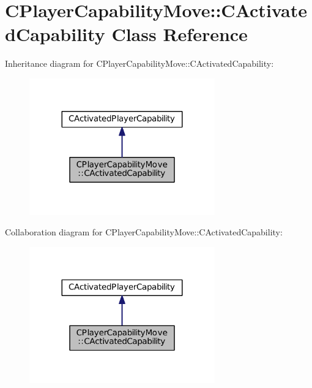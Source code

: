 \hypertarget{classCPlayerCapabilityMove_1_1CActivatedCapability}{}\section{C\+Player\+Capability\+Move\+:\+:C\+Activated\+Capability Class Reference}
\label{classCPlayerCapabilityMove_1_1CActivatedCapability}


Inheritance diagram for C\+Player\+Capability\+Move\+:\+:C\+Activated\+Capability\+:\nopagebreak
\begin{figure}[H]
\begin{center}
\leavevmode
\includegraphics[width=227pt]{classCPlayerCapabilityMove_1_1CActivatedCapability__inherit__graph}
\end{center}
\end{figure}


Collaboration diagram for C\+Player\+Capability\+Move\+:\+:C\+Activated\+Capability\+:\nopagebreak
\begin{figure}[H]
\begin{center}
\leavevmode
\includegraphics[width=227pt]{classCPlayerCapabilityMove_1_1CActivatedCapability__coll__graph}
\end{center}
\end{figure}
